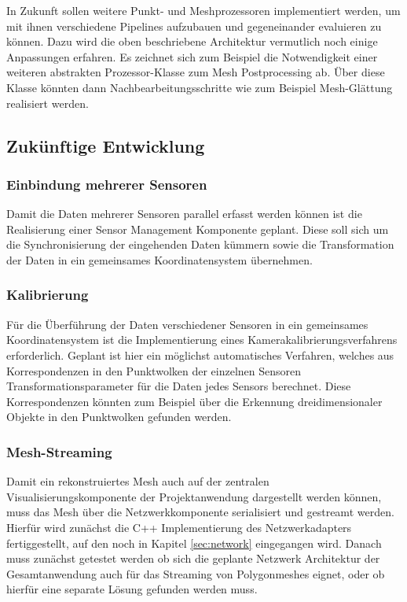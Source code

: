 In Zukunft sollen weitere Punkt- und Meshprozessoren implementiert werden, um mit ihnen verschiedene Pipelines aufzubauen und gegeneinander evaluieren zu können. Dazu wird die oben beschriebene Architektur vermutlich noch einige Anpassungen erfahren. Es zeichnet sich zum Beispiel die Notwendigkeit einer weiteren abstrakten Prozessor-Klasse zum Mesh Postprocessing ab. Über diese Klasse könnten dann Nachbearbeitungsschritte wie zum Beispiel Mesh-Glättung realisiert werden.


\subsection{Zukünftige Entwicklung}
\subsubsection{Einbindung mehrerer Sensoren}
Damit die Daten mehrerer Sensoren parallel erfasst werden können ist die Realisierung einer Sensor Management Komponente geplant. Diese soll sich um die Synchronisierung der eingehenden Daten kümmern sowie die Transformation der Daten in ein gemeinsames Koordinatensystem übernehmen.

\subsubsection{Kalibrierung}
Für die Überführung der Daten verschiedener Sensoren in ein gemeinsames Koordinatensystem ist die Implementierung eines Kamerakalibrierungsverfahrens erforderlich. Geplant ist hier ein möglichst automatisches Verfahren, welches aus Korrespondenzen in den Punktwolken der einzelnen Sensoren Transformationsparameter für die Daten jedes Sensors berechnet. Diese Korrespondenzen könnten zum Beispiel über die Erkennung dreidimensionaler Objekte in den Punktwolken gefunden werden.

\subsubsection{Mesh-Streaming}
Damit ein rekonstruiertes Mesh auch auf der zentralen Visualisierungskomponente der Projektanwendung dargestellt werden können, muss das Mesh über die Netzwerkkomponente serialisiert und gestreamt werden. Hierfür wird zunächst die C++ Implementierung des Netzwerkadapters fertiggestellt, auf den noch in Kapitel \ref{sec:network} eingegangen wird. Danach muss zunächst getestet werden ob sich die geplante Netzwerk Architektur der Gesamtanwendung auch für das Streaming von Polygonmeshes eignet, oder ob hierfür eine separate Lösung gefunden werden muss.

